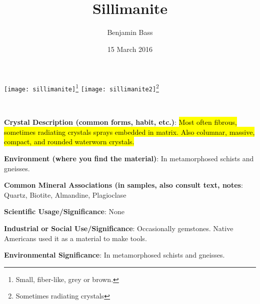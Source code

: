 \documentclass[10pt]{article}
\author{Benjamin Bass}
\date{15 March 2016}
\title{\vspace{-2.0cm} Sillimanite} %
\begin{document}
\maketitle


\begin{center}
  \texttt{[image: sillimanite]}\footnote{Small, fiber-like, grey or brown.}
  \texttt{[image: sillimanite2]}\footnote{Sometimes radiating crystals}
\end{center}



\
\
\
\
\
\
\
\
\
\

\begin{framed}
  \textbf{Crystal Description (common forms, habit, etc.)}: \hl{Most often fibrous, sometimes radiating crystals sprays embedded in matrix. Also columnar, massive, compact, and rounded waterworn crystals.}
\end{framed}

\begin{framed}
  \textbf{Environment (where you find the material)}: In metamorphosed schists and gneisses.
\end{framed}

\begin{framed}
  \textbf{Common Mineral Associations (in samples, also consult text, notes}: Quartz, Biotite, Almandine, Plagioclase
\end{framed}

\begin{framed}
  \textbf{Scientific Usage/Significance}: None
\end{framed}

\begin{framed}
  \textbf{Industrial or Social Use/Significance}: Occasionally gemstones. Native Americans used it as a material to make tools.
\end{framed}

\begin{framed}
  \textbf{Environmental Significance}: In metamorphosed schists and gneisses.
\end{framed}

\end{document}
